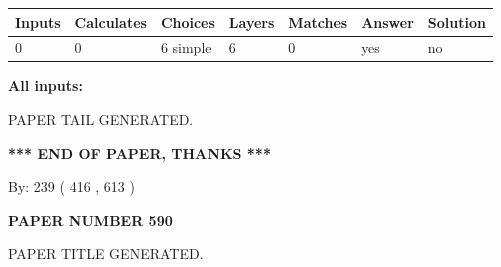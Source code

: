 \documentclass[12pt]{article}
\begin{document}
   
   
   
\noindent\begin{tabular}{|l|l|l|l|l|l|l|}
 \hline
Inputs & Calculates & Choices & Layers & Matches & Answer & Solution \\ \hline
 0  & 
 0  & 
 6
  simple  
  & 
 6  & 
 0  & 
  yes & 
  no 
  \\ \hline
 \end{tabular}
   
   
   
   
\noindent{}
   
   
   
   
\noindent\vspace{0.1in}\hspace{-0.08in} {\textbf{\Large{All inputs: }}}
   
   
   
   
   
   
 \vspace{0.2in}
 
   
   
\vspace{2.0in} PAPER TAIL GENERATED.
   
   
   
   
\vspace{1.0in} 
{\textbf{\large{ *** END OF PAPER, THANKS *** }}} 
   
   
\hspace{1.0in} By: 
 239 ( 416 ,  613 )
   
   
   
   
\newpage 
\setcounter{page}{ 
   590001 } 
   
   
   
   
 {\textbf{ \Large{ PAPER NUMBER  590  }}}
   
   
\vspace{0.2in}
   
   
   
   
   
   
   
   
 \vspace{0.2in}
 
 
 
 
   
   
 PAPER TITLE GENERATED.
   
   
   
\end{document}
